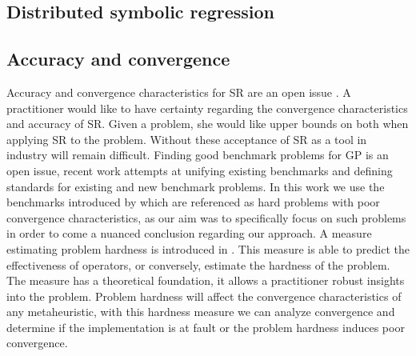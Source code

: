 \subsection{Distributed symbolic regression}
\cite{parallelmetaheuristics}

\subsection{Accuracy and convergence}
Accuracy and convergence characteristics for SR are an open issue \citep{SRAccuracy, SRAccur, SRBaseline}. A practitioner would like to have certainty regarding the convergence characteristics and accuracy of SR. Given a problem, she would like upper bounds on both when applying SR to the problem. Without these acceptance of SR as a tool in industry will remain difficult.
Finding good benchmark problems for GP is an open issue, recent work \citep{GPBenchmarks} attempts at unifying existing benchmarks and defining standards for existing and new benchmark problems. In this work we use the benchmarks introduced by \cite{SRAccuracy} which are referenced as hard problems with poor convergence characteristics, as our aim was to specifically focus on such problems in order to come a nuanced conclusion regarding our approach.
A measure estimating problem hardness is introduced in \citep{GPHardness}. This measure is able to predict the effectiveness of operators, or conversely, estimate the hardness of the problem. The measure has a theoretical foundation, it allows a practitioner robust insights into the problem. Problem hardness will affect the convergence characteristics of any metaheuristic, with this hardness measure we can analyze convergence and determine if the implementation is at fault or the problem hardness induces poor convergence.
